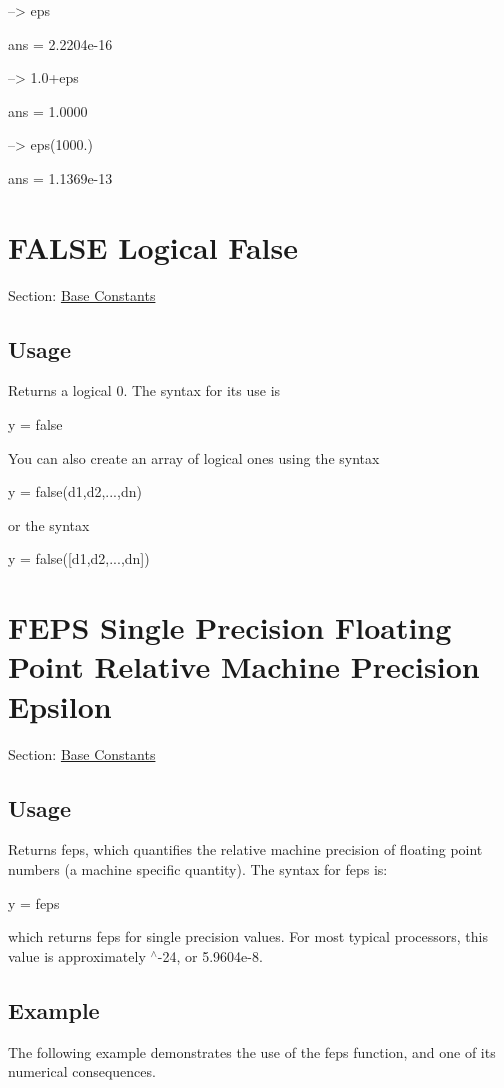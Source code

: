 \begin{DoxyVerbInclude}
--> eps

ans = 
 2.2204e-16 

--> 1.0+eps

ans = 
    1.0000 

--> eps(1000.)

ans = 
 1.1369e-13 
\end{DoxyVerbInclude}
 \hypertarget{constants_false}{}\section{F\-A\-L\-S\-E Logical False}\label{constants_false}
Section\-: \hyperlink{sec_constants}{Base Constants} \hypertarget{vtkwidgets_vtkxyplotwidget_Usage}{}\subsection{Usage}\label{vtkwidgets_vtkxyplotwidget_Usage}
Returns a logical 0. The syntax for its use is \begin{DoxyVerb}   y = false
\end{DoxyVerb}
 You can also create an array of logical ones using the syntax \begin{DoxyVerb}   y = false(d1,d2,...,dn)
\end{DoxyVerb}
 or the syntax \begin{DoxyVerb}   y = false([d1,d2,...,dn])
\end{DoxyVerb}
 \hypertarget{constants_feps}{}\section{F\-E\-P\-S Single Precision Floating Point Relative Machine Precision Epsilon}\label{constants_feps}
Section\-: \hyperlink{sec_constants}{Base Constants} \hypertarget{vtkwidgets_vtkxyplotwidget_Usage}{}\subsection{Usage}\label{vtkwidgets_vtkxyplotwidget_Usage}
Returns {\ttfamily feps}, which quantifies the relative machine precision of floating point numbers (a machine specific quantity). The syntax for {\ttfamily feps} is\-: \begin{DoxyVerb}   y = feps
\end{DoxyVerb}
 which returns {\ttfamily feps} for {\ttfamily single} precision values. For most typical processors, this value is approximately {$^\wedge$-\/24}, or 5.\-9604e-\/8. \hypertarget{variables_struct_Example}{}\subsection{Example}\label{variables_struct_Example}
The following example demonstrates the use of the {\ttfamily feps} function, and one of its numerical consequences.


